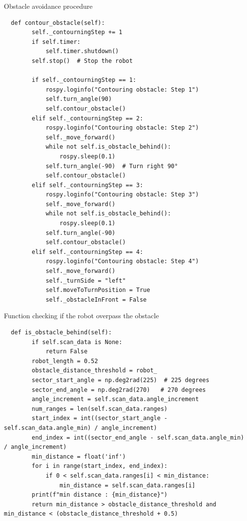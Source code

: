 \documentclass[../../main]{subfiles}
\begin{document}
\begin{codebox}[]{Obstacle avoidance procedure}
  \begin{verbatim}
  def contour_obstacle(self):
        self._contourningStep += 1 
        if self.timer:
            self.timer.shutdown()  
        self.stop()  # Stop the robot
        
        if self._contourningStep == 1:
            rospy.loginfo("Contouring obstacle: Step 1")
            self.turn_angle(90)  
            self.contour_obstacle()
        elif self._contourningStep == 2:
            rospy.loginfo("Contouring obstacle: Step 2")
            self._move_forward()  
            while not self.is_obstacle_behind():
                rospy.sleep(0.1)
            self.turn_angle(-90)  # Turn right 90°
            self.contour_obstacle()
        elif self._contourningStep == 3:
            rospy.loginfo("Contouring obstacle: Step 3")
            self._move_forward()  
            while not self.is_obstacle_behind():
                rospy.sleep(0.1)
            self.turn_angle(-90)  
            self.contour_obstacle()
        elif self._contourningStep == 4:
            rospy.loginfo("Contouring obstacle: Step 4")
            self._move_forward()  
            self._turnSide = "left"
            self.moveToTurnPosition = True
            self._obstacleInFront = False
\end{verbatim}
\end{codebox}

\begin{codebox}[]{Function checking if the robot overpass the obstacle}
  \begin{verbatim}
  def is_obstacle_behind(self):
        if self.scan_data is None:
            return False  
        robot_length = 0.52  
        obstacle_distance_threshold = robot_
        sector_start_angle = np.deg2rad(225)  # 225 degrees
        sector_end_angle = np.deg2rad(270)   # 270 degrees
        angle_increment = self.scan_data.angle_increment
        num_ranges = len(self.scan_data.ranges)
        start_index = int((sector_start_angle - self.scan_data.angle_min) / angle_increment)
        end_index = int((sector_end_angle - self.scan_data.angle_min) / angle_increment)
        min_distance = float('inf')
        for i in range(start_index, end_index):
            if 0 < self.scan_data.ranges[i] < min_distance:
                min_distance = self.scan_data.ranges[i]
        print(f"min distance : {min_distance}")
        return min_distance > obstacle_distance_threshold and min_distance < (obstacle_distance_threshold + 0.5)
\end{verbatim}
\end{codebox}
\end{document}
